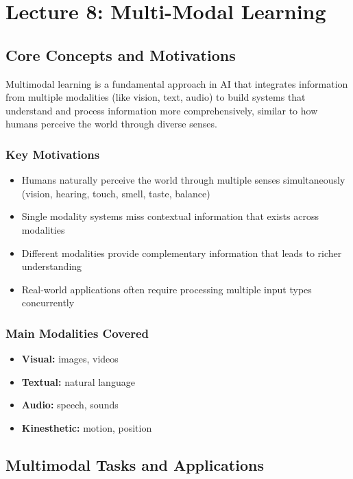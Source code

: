 \chapter{\normalsize Lecture 8: Multi-Modal Learning}
\section*{Core Concepts and Motivations}

Multimodal learning is a fundamental approach in AI that integrates information from multiple modalities (like vision, text, audio) to build systems that understand and process information more comprehensively, similar to how humans perceive the world through diverse senses.

\subsection*{Key Motivations}

\begin{itemize}
    \item Humans naturally perceive the world through multiple senses simultaneously (vision, hearing, touch, smell, taste, balance)
    \item Single modality systems miss contextual information that exists across modalities
    \item Different modalities provide complementary information that leads to richer understanding
    \item Real-world applications often require processing multiple input types concurrently
\end{itemize}

\subsection*{Main Modalities Covered}

\begin{itemize}
    \item \textbf{Visual:} images, videos
    \item \textbf{Textual:} natural language
    \item \textbf{Audio:} speech, sounds
    \item \textbf{Kinesthetic:} motion, position
\end{itemize}

\section*{Multimodal Tasks and Applications}

